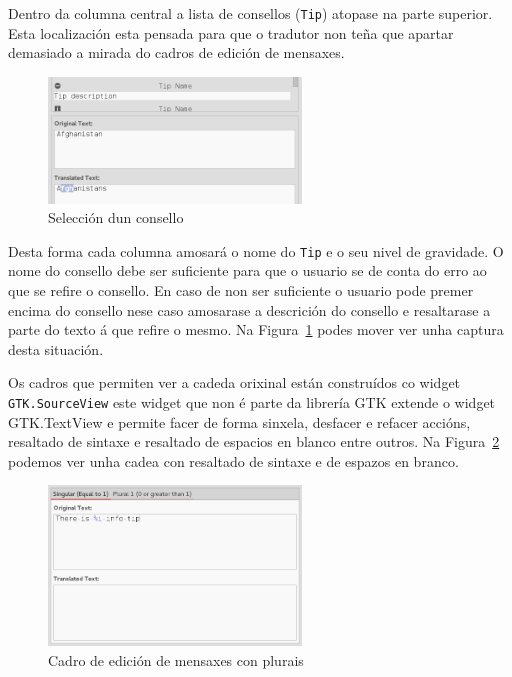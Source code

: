 Dentro da columna central a lista de consellos (\lstinline{Tip}) atopase na parte superior. Esta localización esta pensada para que o tradutor non teña que apartar demasiado a mirada do cadros de edición de mensaxes.

\begin{figure}[h!]
    \centering
    \includegraphics[width=0.6\textwidth]{img/selectedtip.png}
    \caption{Selección dun consello}
    \label{fig:ui:panel:edit:selectedtip}
\end{figure}

Desta forma cada columna amosará o nome do \lstinline{Tip} e o seu nivel de gravidade. O nome do consello debe ser suficiente para que o usuario se de conta do erro ao que se refire o consello. En caso de non ser suficiente o usuario pode premer encima do consello nese caso amosarase a descrición do consello e resaltarase a parte do texto á que refire o mesmo. Na Figura~\ref{fig:ui:panel:edit:selectedtip} podes mover ver unha captura desta situación.

Os cadros que permiten ver a cadeda orixinal están construídos co widget \lstinline{GTK.SourceView} este widget que non é parte da librería GTK extende o widget GTK.TextView e permite facer de forma sinxela, desfacer e refacer accións, resaltado de sintaxe e resaltado de espacios en blanco entre outros. Na Figura~\ref{fig:ui:panel:edit:pluralbox} podemos ver unha cadea con resaltado de sintaxe e de espazos en branco.

\begin{figure}[h!]
    \centering
    \includegraphics[width=0.6\textwidth]{img/editbox.png}
    \caption{Cadro de edición de mensaxes con plurais}
    \label{fig:ui:panel:edit:pluralbox}
\end{figure}

